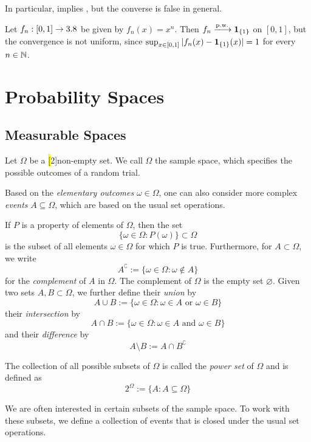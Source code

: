 In particular,
implies 
,
but the converse is false in general.

\begin{example}
Let \(f_n:[0,1]\to3.8\) be given by \(f_n(x)=x^n\). Then
\(
f_n \xlongrightarrow{\mathrm{p.w.}} \ind_{\{1\}}
\)
on \([0,1]\), but the convergence is not uniform, since
\(
\sup_{x\in[0,1]}|f_n(x)-\mathbf{1}_{\{1\}}(x)|
=
1
\)
for every \(n\in\mathbb{N}\).
\end{example}


\pagebreak[3]

\section{Probability Spaces}

\subsection{Measurable Spaces}

Let $\Omega$ be a \hl[2]{non-empty} set.
We call $\Omega$ the sample space, which specifies the possible outcomes of a random trial.

Based on the \emph{elementary outcomes} $\omega \in \Omega$, one can also consider more complex \emph{events} $A \subseteq \Omega$, which are based on the usual set operations.

If $P$ is a property of elements of $\Omega$, then the set
\[
\{\omega \in \Omega : P(\omega)\} \subset \Omega
\]
is the subset of all elements $\omega \in \Omega$ for which $P$ is true.
Furthermore, for $A \subset \Omega$, we write
\[
A^\complement := \{\omega \in \Omega : \omega \notin A\}
\]
for the \emph{complement} of $A$ in $\Omega$.
The complement of $\Omega$ is the empty set $\varnothing$.
Given two sets $A,B\subset \Omega$, we further define their \emph{union} by  
\[
A \cup B := \{\omega \in \Omega : \omega \in A \text{ or } \omega \in B\}
\]
their \emph{intersection} by
\[
A \cap B := \{\omega \in \Omega : \omega \in A \text{ and } \omega \in B\}
\]
and their \emph{difference} by
\[
A \setminus B := A \cap B^\complement
\]

The collection of all possible subsets of $\Omega$ is called the \emph{power set} of $\Omega$ and is defined as
\[
2^\Omega := \{ A : A \subseteq \Omega \}
\]

We are often interested in certain subsets of the sample space.
To work with these subsets, we define a collection of events that is closed under the usual set operations.

